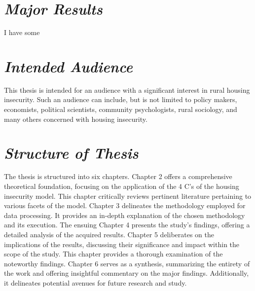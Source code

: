 \section{\textit{Major Results}}
I have some

\section{\textit{Intended Audience}}
This thesis is intended for an audience with a significant interest in rural housing insecurity. Such an audience can include, but is not limited to policy makers, economists, political scientists, community psychologists, rural sociology, and many others concerned with housing insecurity. 

\section{\textit{Structure of Thesis}}
The thesis is structured into six chapters. Chapter 2 offers a comprehensive theoretical foundation, focusing on the application of the 4 C's of the housing insecurity model. This chapter critically reviews pertinent literature pertaining to various facets of the model. Chapter 3 delineates the methodology employed for data processing. It provides an in-depth explanation of the chosen methodology and its execution. The ensuing Chapter 4 presents the study's findings, offering a detailed analysis of the acquired results. Chapter 5 deliberates on the implications of the results, discussing their significance and impact within the scope of the study. This chapter provides a thorough examination of the noteworthy findings. Chapter 6 serves as a synthesis, summarizing the entirety of the work and offering insightful commentary on the major findings. Additionally, it delineates potential avenues for future research and study.

\endinput